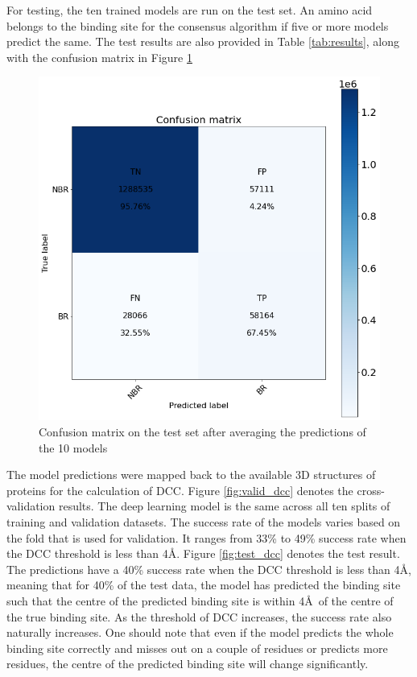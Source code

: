 \documentclass[journal=jcisd8,manuscript=article]{achemso}
\begin{document}
\newpage
For testing, the ten trained models are run on the test set. An amino acid belongs to the binding site for the consensus algorithm if five or more models predict the same. The test results are also provided in Table \ref{tab:results}, along with the confusion matrix in Figure \ref{fig:test_cm}

\begin{figure}
    \centering
    \noindent\includegraphics[scale=0.4]{test_cm.png}
    \caption{\centering Confusion matrix on the test set after averaging the predictions of the 10 models}
    \label{fig:test_cm}
\end{figure}

The model predictions were mapped back to the available 3D structures of proteins for the calculation of DCC. Figure \ref{fig:valid_dcc} denotes the cross-validation results. The deep learning model is the same across all ten splits of training and validation datasets. The success rate of the models varies based on the fold that is used for validation. It ranges from 33\% to 49\% success rate when the DCC threshold is less than 4\AA. Figure \ref{fig:test_dcc} denotes the test result. The predictions have a 40\% success rate when the DCC threshold is less than 4\AA, meaning that for 40\% of the test data, the model has predicted the binding site such that the centre of the predicted binding site is within 4\AA \ of the centre of the true binding site. As the threshold of DCC increases, the success rate also naturally increases. One should note that even if the model predicts the whole binding site correctly and misses out on a couple of residues or predicts more residues, the centre of the predicted binding site will change significantly.
\end{document}
